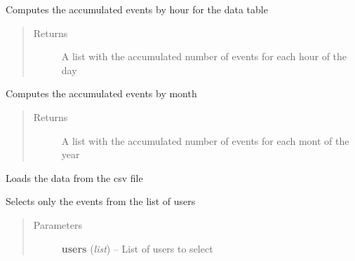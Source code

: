 \documentclass[letterpaper,10pt,english]{sphinxmanual}
\begin{document}
\begin{fulllineitems}
\begin{fulllineitems}
\begin{quote}
\begin{description}
\end{description}\end{quote}

\end{fulllineitems}


\begin{fulllineitems}
\label{index:SuperHub.STData.STData.hourly_table}
Computes the accumulated events by hour for the data table
\begin{quote}\begin{description}
\item[{Returns}] \leavevmode
A list with the accumulated number of events for each hour of the day

\end{description}\end{quote}

\end{fulllineitems}


\begin{fulllineitems}
\label{index:SuperHub.STData.STData.monthly_table}
Computes the accumulated events by month
\begin{quote}\begin{description}
\item[{Returns}] \leavevmode
A list with the accumulated number of events for each mont of the year

\end{description}\end{quote}

\end{fulllineitems}


\begin{fulllineitems}
\label{index:SuperHub.STData.STData.read_data}
Loads the data from the csv file

\end{fulllineitems}


\begin{fulllineitems}
\label{index:SuperHub.STData.STData.select_data_users}
Selects only the events from the list of users
\begin{quote}\begin{description}
\item[{Parameters}] \leavevmode
\textbf{users} (\emph{list}) -- List of users to select


\end{description}
\end{quote}
\end{fulllineitems}
\end{fulllineitems}
\end{document}
